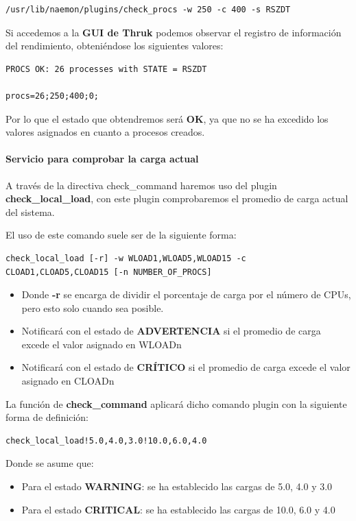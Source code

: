\begin{lstlisting}
/usr/lib/naemon/plugins/check_procs -w 250 -c 400 -s RSZDT
\end{lstlisting}

Si accedemos a la \textbf{GUI de Thruk} podemos observar el registro de información del rendimiento, obteniéndose los siguientes valores:

\begin{lstlisting}
PROCS OK: 26 processes with STATE = RSZDT

procs=26;250;400;0;
\end{lstlisting}

Por lo que el estado que obtendremos será \textbf{OK}, ya que no se ha excedido los valores asignados en cuanto a procesos creados.
\paragraph{Servicio para comprobar la carga actual}

A través de la directiva check\_command haremos uso del plugin \textbf{check\_local\_load}, con este plugin comprobaremos el promedio de carga actual del sistema.

El uso de este comando suele ser de la siguiente forma:
\begin{lstlisting}
check_local_load [-r] -w WLOAD1,WLOAD5,WLOAD15 -c CLOAD1,CLOAD5,CLOAD15 [-n NUMBER_OF_PROCS]
\end{lstlisting}

\begin{itemize}
	\item Donde\textbf{ -r }se encarga de dividir el porcentaje de carga por el número de CPUs, pero esto solo cuando sea posible.
	\item Notificará con el estado de \textbf{ADVERTENCIA} si el promedio de carga excede el valor asignado en WLOADn
	\item Notificará con el estado de \textbf{CRÍTICO} si el promedio de carga excede el valor asignado en CLOADn
\end{itemize}


La función de \textbf{check\_command} aplicará dicho comando plugin con la siguiente forma de definición:
\begin{lstlisting}	
check_local_load!5.0,4.0,3.0!10.0,6.0,4.0
\end{lstlisting} 
\newpage
Donde se asume que:
\begin{itemize}
	\item Para el estado \textbf{WARNING}: se ha establecido las cargas de 5.0, 4.0 y 3.0
	\item Para el estado \textbf{CRITICAL}: se ha establecido las cargas de 10.0, 6.0 y 4.0	
\end{itemize}

